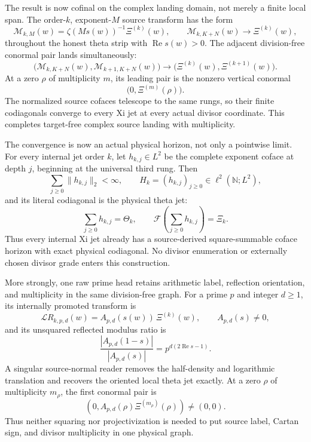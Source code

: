 \documentclass[11pt]{article}
\theoremstyle{definition}
\theoremstyle{remark}
\newcommand{\Rea}{\operatorname{Re}}
\begin{document}
The result is now cofinal on the complex landing domain, not merely a
finite local span.  The order-\(k\), exponent-\(M\) source transform has the
form
\[
 \mathcal M_{k,M}(w)
   =\zeta\!\left(Ms(w)\right)^{-1}\Xi^{(k)}(w),
 \qquad
 \mathcal M_{k,K+N}(w)\longrightarrow\Xi^{(k)}(w),
\tag{3.6a}\label{eq:theta-cofinal-landing}
\]
throughout the honest theta strip with \(\Rea s(w)>0\).  The adjacent
division-free conormal pair lands simultaneously:
\[
 \bigl(\mathcal M_{k,K+N}(w),\mathcal M_{k+1,K+N}(w)\bigr)
 \longrightarrow\bigl(\Xi^{(k)}(w),\Xi^{(k+1)}(w)\bigr).
\tag{3.6b}\label{eq:theta-conormal-landing}
\]
At a zero \(\rho\) of multiplicity \(m\), its leading pair is the nonzero
vertical conormal
\[
                 \bigl(0,\Xi^{(m)}(\rho)\bigr).
\tag{3.6c}\label{eq:theta-leading-conormal}
\]
The normalized source cofaces telescope to the same rungs, so their finite
codiagonals converge to every Xi jet at every actual divisor coordinate.
This completes target-free complex source landing with multiplicity.

The convergence is now an actual physical horizon, not only a pointwise
limit.  For every internal jet order \(k\), let \(h_{k,j}\in L^2\) be the
complete exponent coface at depth \(j\), beginning at the universal third
rung.  Then
\[
 \sum_{j\ge0}\|h_{k,j}\|_2<\infty,\qquad
 H_k=(h_{k,j})_{j\ge0}\in\ell^2(\mathbb N;L^2),
\tag{3.6ca}\label{eq:physical-horizon-admission}
\]
and its literal codiagonal is the physical theta jet:
\[
       \sum_{j\ge0}h_{k,j}=\Theta_k,\qquad
       \mathcal F\!\left(\sum_{j\ge0}h_{k,j}\right)=\Xi_k.
\tag{3.6cb}\label{eq:physical-horizon-codiagonal}
\]
Thus every internal Xi jet already has a source-derived square-summable
coface horizon with exact physical codiagonal.  No divisor enumeration or
externally chosen divisor grade enters this construction.

More strongly, one raw prime head retains arithmetic label, reflection
orientation, and multiplicity in the same division-free graph.  For a prime
\(p\) and integer \(d\ge1\), its internally promoted transform is
\[
 \mathcal L R_{k,p,d}(w)=A_{p,d}(s(w))\,\Xi^{(k)}(w),
 \qquad A_{p,d}(s)\ne0,
\tag{3.6d}\label{eq:prime-raw-landing}
\]
and its unsquared reflected modulus ratio is
\[
 \frac{|A_{p,d}(1-s)|}{|A_{p,d}(s)|}
       =p^{d(2\Rea s-1)}.
\tag{3.6e}\label{eq:prime-raw-orientation}
\]
A singular source-normal reader removes the half-density and logarithmic
translation and recovers the oriented local theta jet exactly.  At a zero
\(\rho\) of multiplicity \(m_\rho\), the first conormal pair is
\[
 \left(0,A_{p,d}(\rho)\Xi^{(m_\rho)}(\rho)\right)\ne(0,0).
\tag{3.6f}\label{eq:prime-raw-conormal}
\]
Thus neither squaring nor projectivization is needed to put source label,
Cartan sign, and divisor multiplicity in one physical graph.
\end{document}
